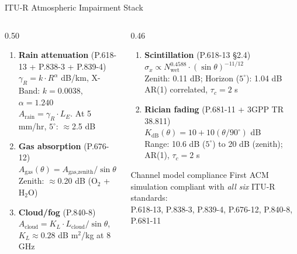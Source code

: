 \documentclass[aspectratio=169,10pt]{beamer}
\begin{document}
\begin{frame}{ITU-R Atmospheric Impairment Stack}
  \begin{columns}[T]
    \begin{column}{0.50\textwidth}
      \begin{enumerate}\scriptsize
        \item \textbf{Rain attenuation} (P.618-13 + P.838-3 + P.839-4)\\
              $\gamma_R = k\cdot R^\alpha$ dB/km, \quad X-Band: $k=0.0038$, $\alpha=1.240$\\
              $A_\text{rain} = \gamma_R\cdot L_E$. At 5 mm/hr, $5^\circ$: $\approx$2.5 dB

        \item \textbf{Gas absorption} (P.676-12)\\
              $A_\text{gas}(\theta) = A_\text{gas,zenith}/\sin\theta$\\
              Zenith: $\approx$0.20 dB (O$_2$ + H$_2$O)

        \item \textbf{Cloud/fog} (P.840-8)\\
              $A_\text{cloud} = K_L\cdot L_\text{cloud}/\sin\theta$, \quad
              $K_L\approx0.28$ dB m$^2$/kg at 8 GHz
      \end{enumerate}
    \end{column}
    \begin{column}{0.46\textwidth}
      \begin{enumerate}\scriptsize\setcounter{enumi}{3}
        \item \textbf{Scintillation} (P.618-13 §2.4)\\
              $\sigma_x\propto N_\text{wet}^{0.4588}\cdot(\sin\theta)^{-11/12}$\\
              Zenith: 0.11 dB; Horizon ($5^\circ$): 1.04 dB\\
              AR(1) correlated, $\tau_c=2$ s

        \item \textbf{Rician fading} (P.681-11 + 3GPP TR 38.811)\\
              $K_\text{dB}(\theta)=10+10(\theta/90^\circ)$ dB\\
              Range: 10.6 dB ($5^\circ$) to 20 dB (zenith); AR(1), $\tau_c=2$ s
      \end{enumerate}

      \vspace{0.3em}
      \begin{resultbox}{Channel model compliance}
        \scriptsize First ACM simulation compliant with \emph{all six} ITU-R standards:\\
        P.618-13, P.838-3, P.839-4, P.676-12, P.840-8, P.681-11
      \end{resultbox}
    \end{column}
  \end{columns}
\end{frame}
\end{document}
